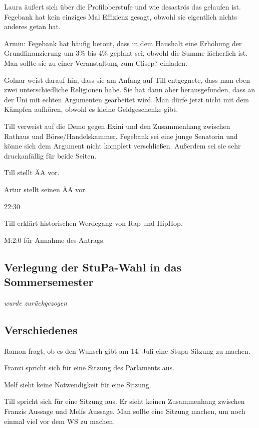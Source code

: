 \documentclass[ngerman,headheight=70pt]{scrartcl}
\begin{document}
    Laura äußert sich über die Profiloberstufe und wie desaströs das gelaufen
    ist. Fegebank hat kein einziges Mal Effizienz gesagt, obwohl sie eigentlich
    nichts anderes getan hat.

    Armin: Fegebank hat häufig betont, dass in dem Haushalt eine Erhöhung
    der Grundfinanzierung um 3\% bis 4\% geplant sei, obwohl die Summe lächerlich
    ist. Man sollte sie zu einer Veranstaltung zum Clisep? einladen.

    Golnar weist darauf hin, dass sie am Anfang auf Till entgegnete, dass
    man eben zwei unterschiedliche Religionen habe. Sie hat dann aber herausgefunden,
    dass an der Uni mit echten Argumenten gearbeitet wird.
    Man dürfe jetzt nicht mit dem Kämpfen aufhören, obwohl es kleine Geldgeschenke
    gibt.

    Till verweist auf die Demo gegen Exini und den Zusammenhang zwischen
    Rathaus und Börse/Handelskammer. Fegebank sei eine junge Senatorin und könne
    sich dem Argument nicht komplett verschließen. Außerdem sei sie sehr
    druckanfällig für beide Seiten.

    Till stellt ÄA vor.

    Artur stellt seinen ÄA vor.

    22:30

    Till erklärt historischen Werdegang von Rap und HipHop.

    M:2:0 für Annahme des Antrags.

    \subsection{Verlegung der StuPa-Wahl in das Sommersemester}

    \textit{wurde zurückgezogen}

    \subsection{Verschiedenes}

    Ramon fragt, ob es den Wunsch gibt am 14. Juli eine Stupa-Sitzung zu machen.

    Franzi spricht sich für eine Sitzung des Parlaments aus.

    Melf sieht keine Notwendigkeit für eine Sitzung.

    Till spricht sich für eine Sitzung aus. Er sieht keinen Zusammenhang
    zwischen Franzis Aussage und Melfs Aussage. Man sollte eine Sitzung machen,
    um noch einmal viel vor dem WS zu machen.
\end{document}
